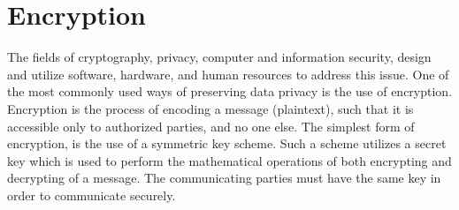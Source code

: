 \section{Encryption}
The fields of cryptography, privacy, computer and information security, design and utilize software, hardware, and human resources to address this issue.
One of the most commonly used ways of preserving data privacy is the use of encryption. Encryption is the process of encoding a message (plaintext), such that it is accessible only to authorized parties, and no one else.
The simplest form of encryption, is the use of a symmetric key scheme. Such a scheme utilizes a secret key which is used to perform the mathematical operations of both encrypting and decrypting of a message.
The communicating parties must have the same key in order to communicate securely.
